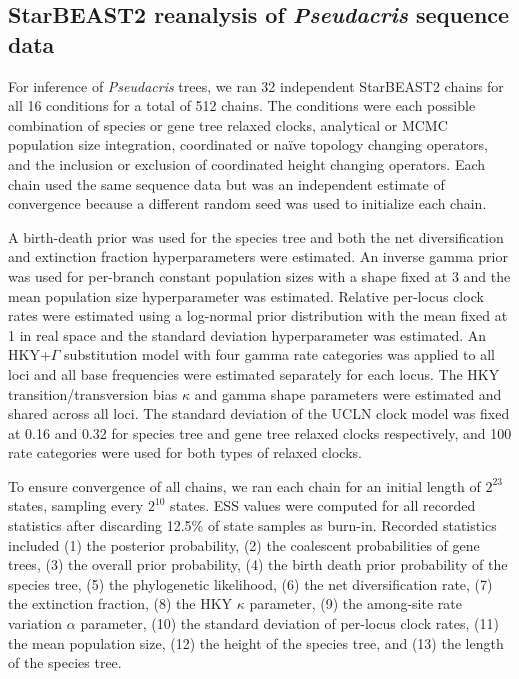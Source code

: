 \documentclass[12pt]{article}
\begin{document}
\subsection{StarBEAST2 reanalysis of \textit{Pseudacris} sequence data}

For inference of \textit{Pseudacris} trees, we ran 32 independent StarBEAST2
chains for all 16 conditions for a total of 512 chains. The conditions were each
possible combination of species or gene tree relaxed clocks, analytical or
MCMC population size integration, coordinated or na\"ive topology changing
operators, and the inclusion or exclusion of coordinated height changing
operators. Each chain used the same sequence data but was an independent
estimate of convergence because a different random seed was used to initialize
each chain.

A birth-death prior was used for the species tree and both the net
diversification and extinction fraction hyperparameters were estimated. An
inverse gamma prior was used for per-branch constant population sizes with a
shape fixed at 3 and the mean population size hyperparameter was estimated.
Relative per-locus clock rates were estimated using a log-normal prior
distribution with the mean fixed at 1 in real space and the standard deviation
hyperparameter was estimated. An HKY+$\Gamma$ substitution model with four gamma
rate categories was applied to all loci and all base frequencies were estimated
separately for each locus. The HKY transition/transversion bias $\kappa$ and
gamma shape parameters were estimated and shared across all loci. The standard
deviation of the UCLN clock model was fixed at 0.16 and 0.32 for species tree
and gene tree relaxed clocks respectively, and 100 rate categories were used for
both types of relaxed clocks.

To ensure convergence of all chains, we ran each chain for an initial length of
$2^{23}$ states, sampling every $2^{10}$ states. ESS values were computed for
all recorded statistics after discarding 12.5\% of state samples as burn-in.
Recorded statistics included (1) the posterior probability, (2) the coalescent
probabilities of gene trees, (3) the overall prior probability, (4) the birth
death prior probability of the species tree, (5) the phylogenetic likelihood,
(6) the net diversification rate, (7) the extinction fraction, (8) the HKY
$\kappa$ parameter, (9) the among-site rate variation $\alpha$ parameter, (10)
the standard deviation of per-locus clock rates, (11) the mean population size,
(12) the height of the species tree, and (13) the length of the species tree.
\end{document}
